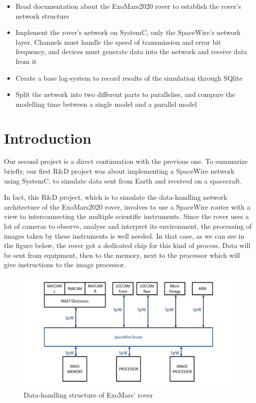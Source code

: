 \documentclass[12pt,a4paper]{article}
\begin{document}
\begin{itemize}
    \item Read documentation about the ExoMars2020 rover to establish the rover's network structure
    \item Implement the rover's network on SystemC, only the SpaceWire's network layer. Channels must handle the speed of transmission and error bit frequency, and devices must generate data into the network and receive data from it
    \item Create a base log-system to record results of the simulation through SQlite
    \item Split the network into two different parts to parallelise, and compare the modelling time between a single model and a parallel model
\end{itemize}
\section{Introduction}

Our second project is a direct continuation with the previous one. To summarize briefly, our first R\&D project was about implementing a SpaceWire network using SystemC, to simulate data sent from Earth and received on a spacecraft.\smallbreak

In fact, this R\&D project, which is to simulate the data-handling network architecture of the ExoMars2020 rover, involves to use a SpaceWire router with a view to interconnecting the multiple scientific instruments. Since the rover uses a lot of cameras to observe, analyse and interpret its environment, the processing of images taken by these instruments is well needed. In that case, as we can see in the figure below, the rover got a dedicated chip for this kind of process. Data will be sent from equipment, then to the memory, next to the processor which will give instructions to the image processor.\smallbreak

\begin{figure}[h]
	\centering
    \includegraphics[scale = 0.49]{pictures/data_network_architecture.png}
    \caption{Data-handling structure of ExoMars' rover}
\end{figure}
\end{document}
